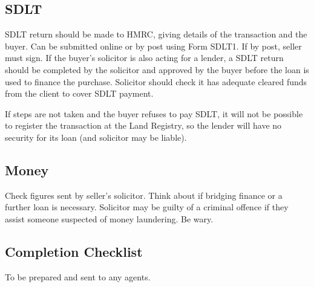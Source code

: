 \documentclass[
]{article}
\begin{document}
\hypertarget{sdlt}{%
\subsection{SDLT}\label{sdlt}}

SDLT return should be made to HMRC, giving details of the transaction
and the buyer. Can be submitted online or by post using Form SDLT1. If
by post, seller must sign. If the buyer's solicitor is also acting for a
lender, a SDLT return should be completed by the solicitor and approved
by the buyer before the loan is used to finance the purchase. Solicitor
should check it has adequate cleared funds from the client to cover SDLT
payment.

If steps are not taken and the buyer refuses to pay SDLT, it will not be
possible to register the transaction at the Land Registry, so the lender
will have no security for its loan (and solicitor may be liable).

\hypertarget{money}{%
\subsection{Money}\label{money}}

Check figures sent by seller's solicitor. Think about if bridging
finance or a further loan is necessary. Solicitor may be guilty of a
criminal offence if they assist someone suspected of money laundering.
Be wary.

\hypertarget{completion-checklist}{%
\subsection{Completion Checklist}\label{completion-checklist}}

To be prepared and sent to any agents.
\end{document}
